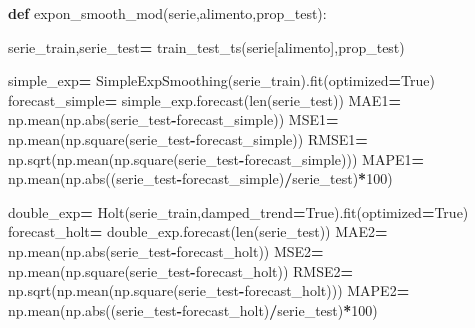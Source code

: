 \documentclass[
]{book}
\newenvironment{Shaded}{\begin{snugshade}}{\end{snugshade}}
\newcommand{\BuiltInTok}[1]{#1}
\newcommand{\DecValTok}[1]{\textcolor[rgb]{0.00,0.00,0.81}{#1}}
\newcommand{\KeywordTok}[1]{\textcolor[rgb]{0.13,0.29,0.53}{\textbf{#1}}}
\newcommand{\NormalTok}[1]{#1}
\newcommand{\OperatorTok}[1]{\textcolor[rgb]{0.81,0.36,0.00}{\textbf{#1}}}
\newcommand{\VariableTok}[1]{\textcolor[rgb]{0.00,0.00,0.00}{#1}}
\begin{document}
\begin{Shaded}
\begin{Highlighting}[]
\KeywordTok{def}\NormalTok{ expon\_smooth\_mod(serie,alimento,prop\_test):}
  
\NormalTok{    serie\_train,serie\_test}\OperatorTok{=}\NormalTok{ train\_test\_ts(serie[alimento],prop\_test)}
  
\NormalTok{    simple\_exp}\OperatorTok{=}\NormalTok{ SimpleExpSmoothing(serie\_train).fit(optimized}\OperatorTok{=}\VariableTok{True}\NormalTok{)}
\NormalTok{    forecast\_simple}\OperatorTok{=}\NormalTok{ simple\_exp.forecast(}\BuiltInTok{len}\NormalTok{(serie\_test))}
\NormalTok{    MAE1}\OperatorTok{=}\NormalTok{ np.mean(np.}\BuiltInTok{abs}\NormalTok{(serie\_test}\OperatorTok{{-}}\NormalTok{forecast\_simple))}
\NormalTok{    MSE1}\OperatorTok{=}\NormalTok{ np.mean(np.square(serie\_test}\OperatorTok{{-}}\NormalTok{forecast\_simple))}
\NormalTok{    RMSE1}\OperatorTok{=}\NormalTok{ np.sqrt(np.mean(np.square(serie\_test}\OperatorTok{{-}}\NormalTok{forecast\_simple)))}
\NormalTok{    MAPE1}\OperatorTok{=}\NormalTok{ np.mean(np.}\BuiltInTok{abs}\NormalTok{((serie\_test}\OperatorTok{{-}}\NormalTok{forecast\_simple)}\OperatorTok{/}\NormalTok{serie\_test)}\OperatorTok{*}\DecValTok{100}\NormalTok{)}
  
\NormalTok{    double\_exp}\OperatorTok{=}\NormalTok{ Holt(serie\_train,damped\_trend}\OperatorTok{=}\VariableTok{True}\NormalTok{).fit(optimized}\OperatorTok{=}\VariableTok{True}\NormalTok{)}
\NormalTok{    forecast\_holt}\OperatorTok{=}\NormalTok{ double\_exp.forecast(}\BuiltInTok{len}\NormalTok{(serie\_test))}
\NormalTok{    MAE2}\OperatorTok{=}\NormalTok{ np.mean(np.}\BuiltInTok{abs}\NormalTok{(serie\_test}\OperatorTok{{-}}\NormalTok{forecast\_holt))}
\NormalTok{    MSE2}\OperatorTok{=}\NormalTok{ np.mean(np.square(serie\_test}\OperatorTok{{-}}\NormalTok{forecast\_holt))}
\NormalTok{    RMSE2}\OperatorTok{=}\NormalTok{ np.sqrt(np.mean(np.square(serie\_test}\OperatorTok{{-}}\NormalTok{forecast\_holt)))}
\NormalTok{    MAPE2}\OperatorTok{=}\NormalTok{ np.mean(np.}\BuiltInTok{abs}\NormalTok{((serie\_test}\OperatorTok{{-}}\NormalTok{forecast\_holt)}\OperatorTok{/}\NormalTok{serie\_test)}\OperatorTok{*}\DecValTok{100}\NormalTok{)}
  

\end{Highlighting}
\end{Shaded}
\end{document}
